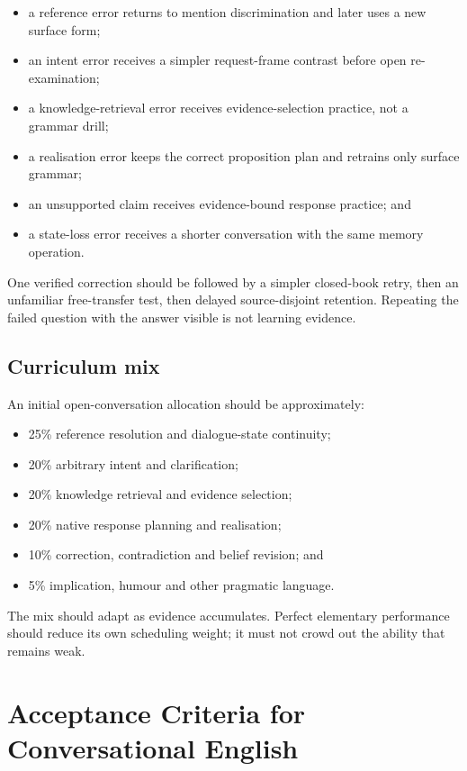 \documentclass[11pt,a4paper]{article}
\begin{document}
\begin{itemize}
  \item a reference error returns to mention discrimination and later uses a new surface form;
  \item an intent error receives a simpler request-frame contrast before open re-examination;
  \item a knowledge-retrieval error receives evidence-selection practice, not a grammar drill;
  \item a realisation error keeps the correct proposition plan and retrains only surface grammar;
  \item an unsupported claim receives evidence-bound response practice; and
  \item a state-loss error receives a shorter conversation with the same memory operation.
\end{itemize}

One verified correction should be followed by a simpler closed-book retry, then an unfamiliar
free-transfer test, then delayed source-disjoint retention.  Repeating the failed question with the
answer visible is not learning evidence.

\subsection{Curriculum mix}

An initial open-conversation allocation should be approximately:

\begin{itemize}
  \item 25\% reference resolution and dialogue-state continuity;
  \item 20\% arbitrary intent and clarification;
  \item 20\% knowledge retrieval and evidence selection;
  \item 20\% native response planning and realisation;
  \item 10\% correction, contradiction and belief revision; and
  \item 5\% implication, humour and other pragmatic language.
\end{itemize}

The mix should adapt as evidence accumulates.  Perfect elementary performance should reduce its
own scheduling weight; it must not crowd out the ability that remains weak.

\section{Acceptance Criteria for Conversational English}
\end{document}
